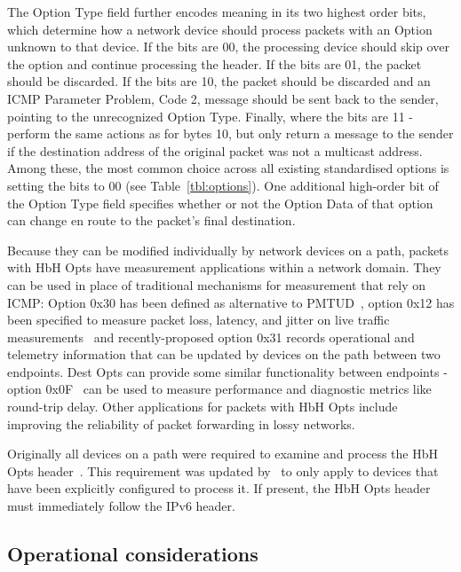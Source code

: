 \documentclass[conference]{IEEEtran}
\begin{document}
The Option Type field further encodes meaning in its two highest order bits, which determine how a network device should process packets with an Option unknown to that device. If the bits are 00, the processing device should skip over the option and continue processing the header. If the bits are 01, the packet should be discarded. If the bits are 10, the packet should be discarded and an ICMP Parameter Problem, Code 2, message should be sent back to the sender, pointing to the unrecognized Option Type. Finally, where the bits are 11 - perform the same actions as for bytes 10, but only return a message to the sender if the destination address of the original packet was not a multicast address. 
Among these, the most common choice across all existing standardised options is setting the bits to 00 (see Table~\ref{tbl:options}).
One additional high-order bit of the Option Type field specifies whether or not the Option Data of that option can change en route to the packet's final destination.


Because they can be modified individually by network devices on a path, packets with HbH Opts have measurement applications within a network domain. They can be used in place of traditional mechanisms for measurement that rely on ICMP: Option 0x30 has been defined as alternative to PMTUD~\cite{rfc9268}, option 0x12 has been specified to measure packet loss, latency, and jitter on live traffic measurements~\cite{rfc9343} and recently-proposed option 0x31 records operational and telemetry information that can be updated by devices on the path between two endpoints. Dest Opts can provide some similar functionality between endpoints - option 0x0F~\cite{rfc8250} can be used to measure performance and diagnostic metrics like round-trip delay.
Other applications for packets with HbH Opts include improving the reliability of packet forwarding in lossy networks.

Originally all devices on a path were required to examine and process the HbH Opts header~\cite{rfc2460}. This requirement was updated by~\cite{RFC8200} to only apply to devices that have been explicitly configured to process it. If present, the HbH Opts header must immediately follow the IPv6 header. 

\subsection{Operational considerations}
\end{document}
